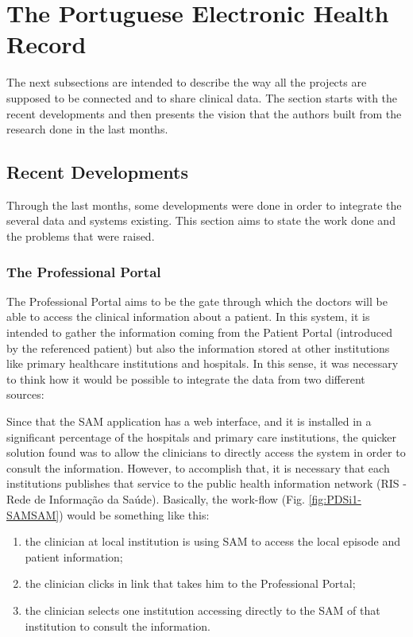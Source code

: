 \section{The Portuguese Electronic Health Record}

The next subsections are intended to describe the way all the projects are supposed to be connected and to share clinical data. The section starts with the recent developments and then presents the vision that the authors built from the research done in the last months.

\subsection{Recent Developments}

Through the last months, some developments were done in order to integrate the several data and systems existing. This section aims to state the work done and the problems that were raised.

\subsubsection{The Professional Portal}
The Professional Portal aims to be the gate through which the doctors will be able to access the clinical information about a patient. In this system, it is intended to gather the information coming from the Patient Portal (introduced by the referenced patient) but also the information stored at other institutions like primary healthcare institutions and hospitals. In this sense, it was necessary to think how it would be possible to integrate the data from two different sources:

Since that the SAM application has a web interface, and it is installed in a significant percentage of the hospitals and primary care institutions, the quicker solution found was to allow the clinicians to directly access the system in order to consult the information. However, to accomplish that, it is necessary that each institutions publishes that service to the public health information network (RIS - Rede de Informação da Saúde). Basically, the work-flow (Fig. \ref{fig:PDSi1-SAMSAM}) would be something like this:
\begin{enumerate}
\item the clinician at local institution is using SAM to access the local episode and patient information;
\item the clinician clicks in link that takes him to the Professional Portal;
\item the clinician selects one institution accessing directly to the SAM of that institution to consult the information.
\end{enumerate}

